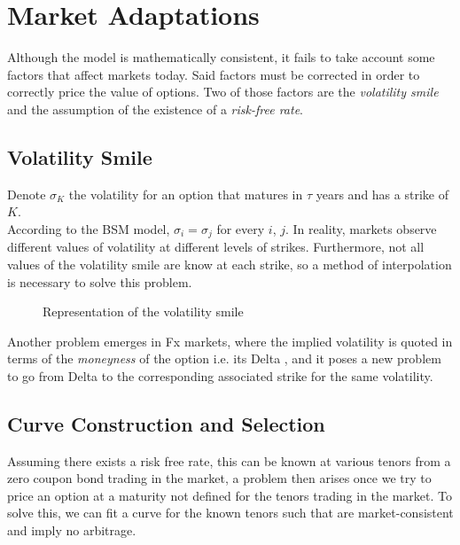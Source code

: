 \documentclass{article}
\begin{document}
\section{Market Adaptations}
Although the \citeauthor{black_scholes} model is mathematically consistent, it fails to take account some factors that affect markets today. Said factors must be corrected in order to correctly price the value of options. Two of those factors are the \textit{volatility smile} and the assumption of the existence of a \textit{risk-free rate}.

\subsection{Volatility Smile}
Denote $\sigma_K$ the volatility for an option that matures in $\tau$ years and has a strike of $K$. \\

According to the BSM model, $\sigma_i = \sigma_j$ for every $i$, $j$. In reality, markets observe different values of volatility at different levels of strikes. Furthermore, not all values of the volatility smile are know at each strike, so a method of interpolation is necessary to solve this problem.

\begin{figure}[h]
    \centering
    \caption{Representation of the volatility smile}
\end{figure}

Another problem emerges in Fx markets, where the implied volatility is quoted in terms of the \textit{moneyness} of the option i.e. its Delta \citep{wys}, and it poses a new problem to go from Delta to the corresponding associated strike for the same volatility.

\subsection{Curve Construction and Selection}
Assuming there exists a risk free rate, this can be known at various tenors from a zero coupon bond trading in the market, a problem then arises once we try to price an option at a maturity not defined for the tenors trading in the market. To solve this, we can fit a curve for the known tenors such that are market-consistent and imply no arbitrage. \\
\end{document}
